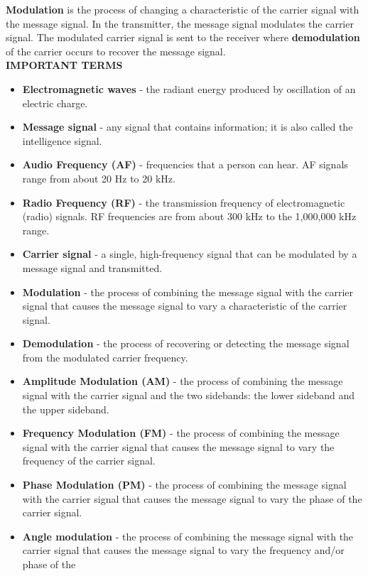 \textbf{Modulation} is the process of changing a characteristic of the carrier signal with the message
signal. In the transmitter, the message signal modulates the carrier signal.
The modulated carrier signal is sent to the receiver where \textbf{demodulation} of the carrier occurs to
recover the message signal.\\[10pt]
\textsc{\textbf {IMPORTANT TERMS}}
\begin{itemize}

\item \textbf{Electromagnetic waves} - the radiant energy produced by oscillation of an electric
charge.

\item \textbf{Message signal} - any signal that contains information; it is also called
the intelligence signal. 
\item \textbf{Audio Frequency (AF)} - frequencies that a person can hear.
AF signals range from about 20 Hz to 20 kHz.
\item \textbf{Radio Frequency (RF)} - the transmission frequency of electromagnetic (radio) signals.
RF frequencies are from about 300 kHz to the 1,000,000 kHz range.
\item \textbf{Carrier signal} - a single, high-frequency signal that can be modulated by a message
signal and transmitted.
\item \textbf{Modulation} - the process of combining the message signal with the carrier signal that
causes the message signal to vary a characteristic of the carrier signal.
\item \textbf{Demodulation} - the process of recovering or detecting the message signal from the
modulated carrier frequency.
\item \textbf{Amplitude Modulation (AM)} - the process of combining the message signal with
the carrier signal and the two sidebands: the lower sideband and the upper
sideband.
\item \textbf{Frequency Modulation (FM)} - the process of combining the message signal with
the carrier signal that causes the message signal to vary the frequency of the
carrier signal.
\item \textbf{Phase Modulation (PM)} - the process of combining the message signal with the
carrier signal that causes the message signal to vary the phase of the carrier signal.
\item \textbf{Angle modulation} - the process of combining the message signal with the carrier signal that causes the message signal to vary the frequency and/or phase of the

\end{itemize}
